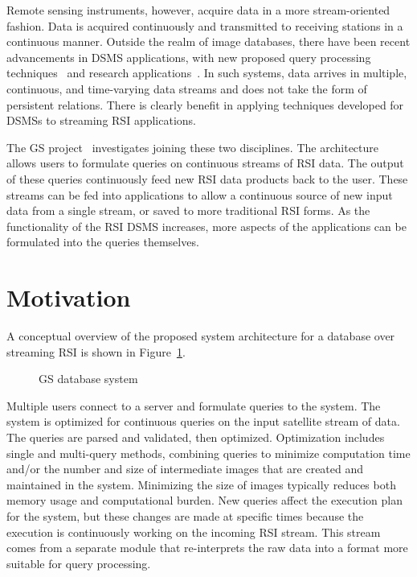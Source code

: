 \documentclass{ucdthesis}       %
\begin{document}
Remote sensing instruments, however, acquire data in a more
stream-oriented fashion.  Data is acquired continuously and
transmitted to receiving stations in a continuous manner.  Outside the
realm of image databases, there have been recent advancements in
\acf{DSMS} applications, with new proposed query processing
techniques~\cite{chen02desig-evaluat, garof02query-minin,
  madden02contin-adapt} and research
applications~\cite{abadi03auror,arasu03stream,chand03teleg}.  In such
systems, data arrives in multiple, continuous, and time-varying data
streams and does not take the form of persistent relations.  There is
clearly benefit in applying techniques developed for \acp{DSMS} to
streaming \ac{RSI} applications.

The \ac{GS} project~\cite{DBLP:conf/ssdbm/HartG05} investigates
joining these two disciplines.  The architecture allows users to
formulate queries on continuous streams of \ac{RSI} data.  The output
of these queries continuously feed new \ac{RSI} data products back to
the user.  These streams can be fed into applications to allow a
continuous source of new input data from a single stream, or saved to
more traditional \ac{RSI} forms.  As the functionality of the \ac{RSI}
\ac{DSMS} increases, more aspects of the applications can be
formulated into the queries themselves.


\section{Motivation}

A conceptual overview of the proposed system architecture for a
database over streaming \ac{RSI} is shown in
Figure~\ref{fig:overview}.  

\begin{figure}[htb]
  \centering
  \scalebox{1.2}{}
  \caption{\ac{GS} database system}
  \label{fig:overview}
\end{figure}

Multiple users connect to a server and formulate queries to the
system.  The system is optimized for continuous queries on the input
satellite stream of data.  The queries are parsed and validated, then
optimized.  Optimization includes single and multi-query methods,
combining queries to minimize computation time and/or the number and
size of intermediate images that are created and maintained in the
system.  Minimizing the size of images typically reduces both memory
usage and computational burden.  New queries affect the execution plan
for the system, but these changes are made at specific times because
the execution is continuously working on the incoming \ac{RSI} stream.
This stream comes from a separate module that re-interprets the raw
data into a format more suitable for query processing.
\end{document}
